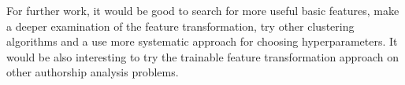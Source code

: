 \documentclass[10pt, a4paper]{article}
\begin{document}
For further work, it would be good to search for more useful basic features, make a deeper examination of the feature transformation, try other clustering algorithms and a use more systematic approach for choosing hyperparameters. It would be also interesting to try the trainable feature transformation approach on other authorship analysis problems.




\end{document}
